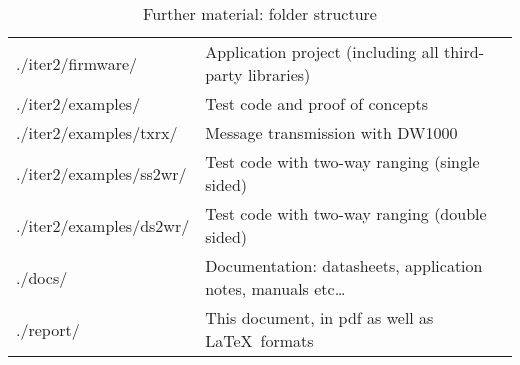 \begin{table}[H]
\begin{tabular}{@{} >{\ttfamily}l l @{}}
    ./iter2/firmware/                                 & Application project (including all third-party libraries)\\
    ./iter2/examples/                                 & Test code and proof of concepts \\
    ./iter2/examples/txrx/                                 & Message transmission with DW1000 \\
    ./iter2/examples/ss2wr/                                 & Test code with two-way ranging (single sided) \\
    ./iter2/examples/ds2wr/                                 & Test code with two-way ranging (double sided) \\
    \addlinespace
    ./docs/                                           & Documentation: datasheets, application notes, manuals etc\dots \\
    \addlinespace
    ./report/                                       & This document, in pdf as well as \LaTeX\ formats \\

    \bottomrule
\end{tabular}
\caption{Further material: folder structure}\label{tab:deliv}
\end{table}
